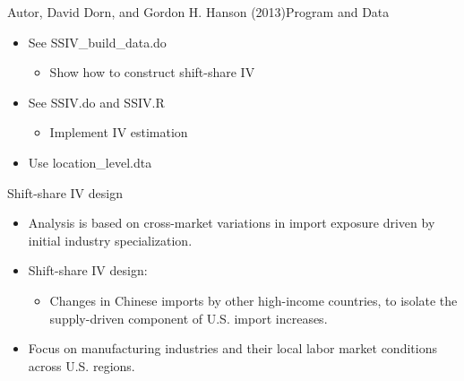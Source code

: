 \documentclass[dvipsnames,hyperref={pdfpagelabels=false}]{beamer}
\begin{document}
\begin{frame}{Autor, David Dorn, and Gordon H. Hanson (2013)}{Program and Data}
	\begin{itemize}
		\item See SSIV\_build\_data.do 
				\vspace{0.2cm}
			\begin{itemize}
		\item Show how to construct shift-share IV
						\vspace{0.2cm}
			\end{itemize}
		\item See SSIV.do and SSIV.R
		\vspace{0.2cm}
		\begin{itemize}
			\item Implement IV estimation
		\end{itemize}
		\vspace{0.2cm}
		\item Use location\_level.dta
		
		
	\end{itemize}
\end{frame}




\begin{frame}{Shift-share IV design}
	\begin{itemize}
		\item Analysis is based on cross-market variations in import exposure driven by initial industry specialization.
						\vspace{0.2cm}
		\item Shift-share IV design: 
								\vspace{0.2cm}
			\begin{itemize}
		\item Changes in Chinese imports by other high-income countries, to isolate the supply-driven component of U.S. import increases.
						\vspace{0.2cm}
							\end{itemize}
		\item Focus on manufacturing industries and their local labor market conditions across U.S. regions.
	\end{itemize}
\end{frame}
\end{document}

